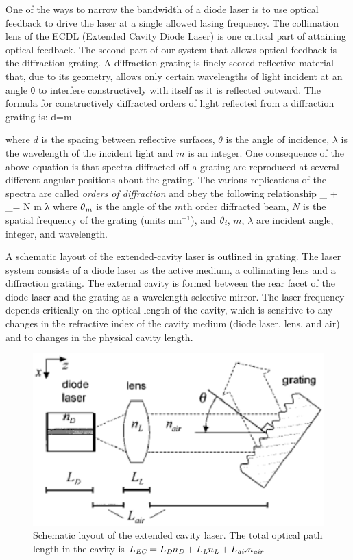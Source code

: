 One of the ways to narrow the bandwidth of a diode laser is to use optical feedback to drive the laser at a single allowed lasing frequency. The collimation lens of the ECDL (Extended Cavity Diode Laser) is one critical part of attaining optical feedback. The second part of our system that allows optical feedback is the diffraction  grating. A diffraction grating is finely scored reflective material that, due to its geometry, allows only certain wavelengths of light incident at an angle θ to interfere constructively with itself as it is reflected outward. The formula for constructively diffracted orders of light reflected from a diffraction grating is:
\mate
d\sin\theta=m\lambda
\atem

where $d$ is the spacing between reflective surfaces, $\theta$ is the angle of incidence, $\lambda$ is the wavelength of the incident light and $m$ is an integer. One consequence of the above equation is that spectra diffracted off a grating are reproduced at several different angular positions about the grating. The various replications of the spectra are called \textit{orders of diffraction} and obey the following relationship 
\mate
\sin\theta_{} + \sin\theta_{}= N m λ
\atem
where $\theta_{\textit{m}}$ is the angle of the $m$th order diffracted beam, $N$ is the spatial frequency of the grating (units nm$^{-1}$), and $\theta_{\textit{i}}$, $m$, $λ$ are incident angle, integer, and wavelength.

A schematic layout of the extended-cavity laser is outlined in grating. The laser system consists of a diode laser as the active medium, a collimating lens and a diffraction grating. The external cavity is formed between the rear facet of the diode laser and the grating as a wavelength selective mirror. The laser frequency depends critically on the optical length of the cavity, which is sensitive to any changes in the refractive index of the cavity medium  (diode laser, lens, and air) and to changes in the physical cavity length.

\begin{figure}[!hbt]\centering
\includegraphics[width=\linewidth]{eps/grating.eps}
\caption{Schematic layout of the extended cavity laser. The total optical path length in the cavity is $L_{\textit{EC}}=L_{\textit{D}}n_{\textit{D}}+L_{\textit{L}}n_{\textit{L}}+L_{\textit{air}}n_{\textit{air}}$}
\label{grating}
\end{figure}

